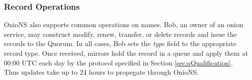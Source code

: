 \documentclass[USenglish,oneside,twocolumn]{article}
\begin{document}
%
%





\subsubsection{Record Operations}
\label{sec:recordOps}


OnioNS also supports common operations on names. Bob, an owner of an onion service, may construct modify, renew, transfer, or delete records and issue the records to the Quorum. In all cases, Bob sets the \emph{type} field to the appropriate record type. Once received, mirrors hold the record in a queue and apply them at 00:00 UTC each day by the protocol specified in Section \ref{sec:qQualification}. Thus updates take up to 24 hours to propegate through OnioNS.
\end{document}

